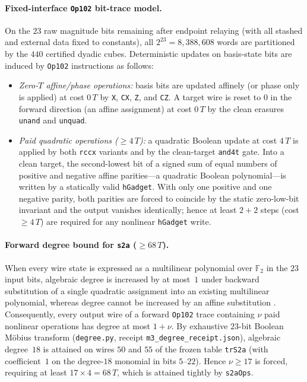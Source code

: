 \documentclass[11pt,a4paper]{article}
\theoremstyle{definition}
\theoremstyle{remark}
\begin{document}
\paragraph{Fixed-interface \texttt{Op102} bit-trace model.}
On the \(23\) raw magnitude bits remaining after endpoint relaying (with all stashed and external data fixed to constants), all \(2^{23} = 8{,}388{,}608\) words are partitioned by the \(440\) certified dyadic cubes. Deterministic updates on basis-state bits are induced by \texttt{Op102} instructions as follows:
\begin{itemize}
\item \emph{Zero-\(T\) affine/phase operations:} basis bits are updated affinely (or phase only is applied) at cost \(0\,T\) by \texttt{X}, \texttt{CX}, \texttt{Z}, and \texttt{CZ}. A target wire is reset to \(0\) in the forward direction (an affine assignment) at cost \(0\,T\) by the clean erasures \texttt{unand} and \texttt{unquad}.
\item \emph{Paid quadratic operations (\(\ge 4\,T\)):} a quadratic Boolean update at cost \(4\,T\) is applied by both \texttt{rccx} variants and by the clean-target \texttt{and4t} gate. Into a clean target, the second-lowest bit of a signed sum of equal numbers of positive and negative affine parities---a quadratic Boolean polynomial---is written by a statically valid \texttt{hGadget}. With only one positive and one negative parity, both parities are forced to coincide by the static zero-low-bit invariant and the output vanishes identically; hence at least \(2+2\) steps (cost \(\ge 4\,T\)) are required for any nonlinear \texttt{hGadget} write.
\end{itemize}

\paragraph{Forward degree bound for \texttt{s2a} (\(\ge 68\,T\)).}
When every wire state is expressed as a multilinear polynomial over \(\mathbb{F}_2\) in the \(23\) input bits, algebraic degree is increased by at most~\(1\) under backward substitution of a single quadratic assignment into an existing multilinear polynomial, whereas degree cannot be increased by an affine substitution \cite{schnorr1989}. Consequently, every output wire of a forward \texttt{Op102} trace containing \(\nu\) paid nonlinear operations has degree at most \(1 + \nu\). By exhaustive \(23\)-bit Boolean M\"obius transform (\texttt{degree.py}, receipt \texttt{m3\_degree\_receipt.json}), algebraic degree~\(18\) is attained on wires \(50\) and \(55\) of the frozen table \texttt{trS2a} (with coefficient~\(1\) on the degree-\(18\) monomial in bits \(5\text{--}22\)). Hence \(\nu \ge 17\) is forced, requiring at least \(17 \times 4 = 68\,T\), which is attained tightly by \texttt{s2aOps}.
\end{document}
